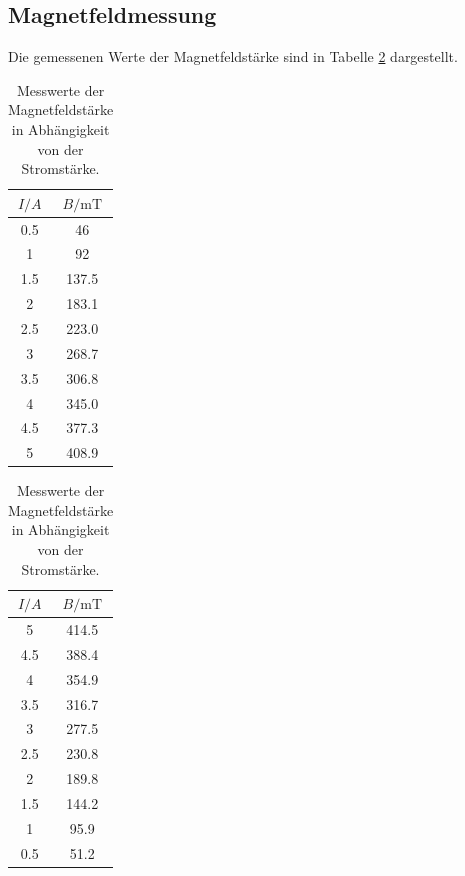 \subsection{Magnetfeldmessung}
Die gemessenen Werte der Magnetfeldstärke sind in Tabelle \ref{tab:atab1} dargestellt.
\FloatBarrier
\begin{table}[h]
    \centering
    \caption{Messwerte der Magnetfeldstärke in Abhängigkeit von der Stromstärke.}
    \begin{minipage}{0.45\textwidth}
        \centering
        \label{tab:atab1}
        \begin{tabular}{c c}
            \toprule
            {$I / A$} & {$B / \text{mT}$} \\
            \midrule
            0.5 & 46    \\ 
            1   & 92    \\
            1.5 & 137.5 \\
            2   & 183.1 \\
            2.5 & 223.0 \\
            3   & 268.7 \\
            3.5 & 306.8 \\
            4   & 345.0 \\
            4.5 & 377.3 \\
            5   & 408.9 \\
            \bottomrule
        \end{tabular}
    \end{minipage} \hfill%
    \begin{minipage}{0.45\textwidth}
        \centering
        \begin{tabular}{c c}
            \toprule
            {$I / A$} & {$B / \text{mT}$} \\
            \midrule
            5   & 414.5 \\
            4.5 & 388.4 \\
            4   & 354.9 \\
            3.5 & 316.7 \\
            3   & 277.5 \\
            2.5 & 230.8 \\
            2   & 189.8 \\
            1.5 & 144.2 \\
            1   & 95.9  \\
            0.5 & 51.2  \\
            \bottomrule
        \end{tabular}
    \end{minipage}
\end{table}
